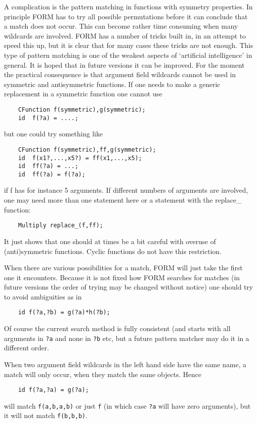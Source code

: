 A complication is the pattern matching in functions with symmetry 
properties. In principle FORM has to try all possible permutations before 
it can conclude that a match does not occur. This can become rather time 
consuming when many wildcards are involved. FORM has a number of tricks 
built in, in an attempt to speed this up, but it is clear that for many 
cases these tricks are not enough. This type of pattern matching is one of 
the weakest aspects of `artificial intelligence' in general. It is hoped 
that in future versions it can be improved. For the moment the practical 
consequence is that argument field wildcards cannot be used in symmetric 
and antisymmetric functions. If one needs to make a generic replacement in 
a symmetric function one cannot use
\begin{verbatim}
    CFunction f(symmetric),g(symmetric);
    id  f(?a) = ....;
\end{verbatim}
but one could try something like
\begin{verbatim}
    CFunction f(symmetric),ff,g(symmetric);
    id  f(x1?,...,x5?) = ff(x1,...,x5);
    id  ff(?a) = ...;
    id  ff(?a) = f(?a);
\end{verbatim}
if f has for instance 5 arguments. If different numbers of arguments are 
involved, one may need more than one statement here or a statement with the 
replace\_ function:
\begin{verbatim}
    Multiply replace_(f,ff);
\end{verbatim}
It just shows that one should at times be a bit careful with overuse of 
(anti)symmetric functions. Cyclic functions do not have this restriction.

When there are various possibilities for a match, FORM will just take the 
first one it encounters. Because it is not fixed how FORM searches for 
matches (in future versions the order of trying may be changed without 
notice) one should try to avoid ambiguities as in
\begin{verbatim}
    id f(?a,?b) = g(?a)*h(?b);
\end{verbatim}
Of course the current search method is fully consistent (and starts with 
all arguments in \verb:?a: and none in \verb:?b: etc, but a future pattern 
matcher may do it in a different order.

When two argument field wildcards in the left hand side have the same name, 
a match will only occur, when they match the same objects. Hence
\begin{verbatim}
    id f(?a,?a) = g(?a);
\end{verbatim}
will match \verb:f(a,b,a,b): or just \verb:f: (in which case \verb:?a: will 
have zero arguments), but it will not match \verb:f(b,b,b):.

